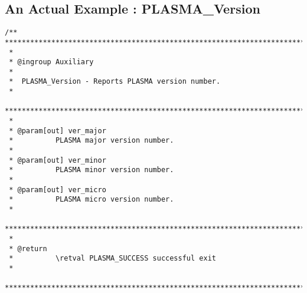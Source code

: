 \pagebreak

\subsection{An Actual Example : PLASMA\_Version}
\label{comments:example}
\begin{verbatim}
/** ****************************************************************************
 *
 * @ingroup Auxiliary
 *
 *  PLASMA_Version - Reports PLASMA version number.
 *
 *******************************************************************************
 *
 * @param[out] ver_major
 *          PLASMA major version number.
 *
 * @param[out] ver_minor
 *          PLASMA minor version number.
 *
 * @param[out] ver_micro
 *          PLASMA micro version number.
 *
 *******************************************************************************
 *
 * @return
 *          \retval PLASMA_SUCCESS successful exit
 *
 ******************************************************************************/
\end{verbatim}

